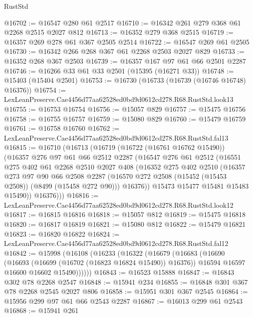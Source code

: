 \begin{lexlean}{RustStd}
\begin{coremodule}
@16702 := @16547 @280 @61 @2517
@16710 := @16342 @261 @279 @368 @61 @2268 @2515 @2027 @812
@16713 := @16352 @279 @368 @2515
@16719 := @16357 @269 @278 @61 @367 @2505 @2514
@16722 := @16547 @269 @61 @2505
@16730 := @16342 @266 @268 @367 @61 @2268 @2503 @2027 @829
@16733 := @16352 @268 @367 @2503
@16739 := @16357 @167 @97 @61 @66 @2501 @2287
@16746 := @16266 @33 @61 @33 @2501 (@15395 (@16271 @33))
@16748 := @15403 (@15404 @2501)
@16753 := @16730 (@16733 (@16739 (@16746 @16748) @16376))
@16754 := LexLeanPreserve.Cae4456d77aa62528ed0bd9d0612cd278.R68.RustStd.look13
@16755 := @16753 @16754
@16756 := @15057 @829
@16757 := @15475 @16756
@16758 := @16755 @16757
@16759 := @15080 @829
@16760 := @15479 @16759
@16761 := @16758 @16760
@16762 := LexLeanPreserve.Cae4456d77aa62528ed0bd9d0612cd278.R68.RustStd.fal13
@16815 := @16710
    (@16713
      (@16719
        (@16722 (@16761 @16762 @15490))
        (@16357
          @276
          @97
          @61
          @66
          @2512
          @2287
          (@16547
            @276
            @61
            @2512
            (@16551
              @275
              @402
              @61
              @2268
              @2510
              @2027
              @408
              (@16352
                @275
                @402
                @2510
                (@16357
                  @273
                  @97
                  @90
                  @66
                  @2508
                  @2287
                  (@16570 @272 @2508 (@15452 (@15453 @2508)) (@8499 (@15458 @272 @90)))
                  @16376))
              @15473
              @15477
              @15481
              @15483
              @15490))
          @16376)))
@16816 := LexLeanPreserve.Cae4456d77aa62528ed0bd9d0612cd278.R68.RustStd.look12
@16817 := @16815 @16816
@16818 := @15057 @812
@16819 := @15475 @16818
@16820 := @16817 @16819
@16821 := @15080 @812
@16822 := @15479 @16821
@16823 := @16820 @16822
@16824 := LexLeanPreserve.Cae4456d77aa62528ed0bd9d0612cd278.R68.RustStd.fal12
@16842 := @15998
    (@16108
      (@16233
        (@16322
          (@16679
            (@16683
              (@16690
                (@16693 (@16699 (@16702 (@16823 @16824 @15490)) @16376))
                @16594
                @16597
                @16600
                @16602
                @15490))))))
@16843 := @16523 @15888
@16847 := @16843 @302 @78 @2268 @2547
@16848 := @15941 @234
@16855 := @16848 @301 @367 @78 @2268 @2545 @2027 @806
@16858 := @15951 @301 @367 @2545
@16864 := @15956 @299 @97 @61 @66 @2543 @2287
@16867 := @16013 @299 @61 @2543
@16868 := @15941 @261

\end{coremodule}
\end{lexlean}
